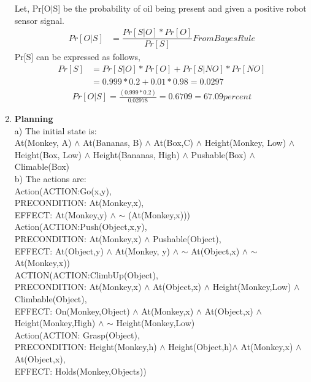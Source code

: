 \documentclass[11pt]{article}
\begin{document}
\begin{enumerate}
Let, Pr[O$\mid$S] be the probability of oil being present and given a positive robot sensor signal. \\
\begin{align*}
Pr[O|S] &= \dfrac{Pr[S|O]*Pr[O]}{Pr[S]} From Bayes Rule
\end{align*}
Pr[S] can be expressed as follows, \\
\begin{align*}
Pr[S]&={Pr[S|O]*Pr[O] + Pr[S|NO]}*{Pr[NO]}\\
&= {0.999*0.2} + {0.01*0.98} = 0.0297 
\end{align*}
\begin{align*}
Pr[O|S] = \frac{(0.999*0.2)}{0.02978} = 0.6709 = 67.09 percent
\end{align*}
\item \textbf{Planning}\\
a) The initial state is: \\
At(Monkey, A) $\wedge$ At(Bananas, B) $\wedge$ At(Box,C) $\wedge$ Height(Monkey, Low) $\wedge$ Height(Box, Low) $\wedge$ Height(Bananas, High) $\wedge$ Pushable(Box) $\wedge$ Climable(Box) \\

b) The actions are: \\
Action(ACTION:Go(x,y), \\
PRECONDITION: At(Monkey,x), \\
EFFECT: At(Monkey,y) $\wedge$ $\sim$ (At(Monkey,x)))\\

Action(ACTION:Push(Object,x,y), \\ PRECONDITION: At(Monkey,x) $\wedge$ Pushable(Object), \\
EFFECT: At(Object,y) $\wedge$ At(Monkey, y) $\wedge$ $\sim$ At(Object,x) $\wedge$ $\sim$ At(Monkey,x))\\

ACTION(ACTION:ClimbUp(Object), \\
PRECONDITION: At(Monkey,x) $\wedge$ At(Object,x) $\wedge$ Height(Monkey,Low) $\wedge$ Climbable(Object), \\
EFFECT: On(Monkey,Object) $\wedge$ At(Monkey,x) $\wedge$ At(Object,x) $\wedge$ Height(Monkey,High) $\wedge$ $\sim$ Height(Monkey,Low)\\

Action(ACTION: Grasp(Object), \\
PRECONDITION: Height(Monkey,h) $\wedge$ Height(Object,h)$\wedge$ At(Monkey,x) $\wedge$ At(Object,x), \\
EFFECT: Holds(Monkey,Objects)) \\


\end{enumerate}
\end{document}
